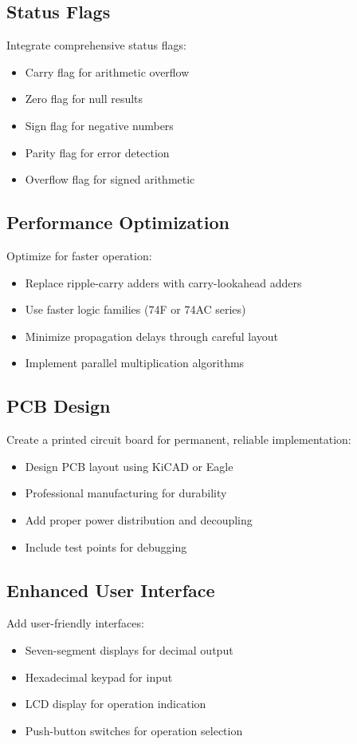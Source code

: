 \subsection{Status Flags}
Integrate comprehensive status flags:
\begin{itemize}
    \item Carry flag for arithmetic overflow
    \item Zero flag for null results
    \item Sign flag for negative numbers
    \item Parity flag for error detection
    \item Overflow flag for signed arithmetic
\end{itemize}

\subsection{Performance Optimization}
Optimize for faster operation:
\begin{itemize}
    \item Replace ripple-carry adders with carry-lookahead adders
    \item Use faster logic families (74F or 74AC series)
    \item Minimize propagation delays through careful layout
    \item Implement parallel multiplication algorithms
\end{itemize}

\subsection{PCB Design}
Create a printed circuit board for permanent, reliable implementation:
\begin{itemize}
    \item Design PCB layout using KiCAD or Eagle
    \item Professional manufacturing for durability
    \item Add proper power distribution and decoupling
    \item Include test points for debugging
\end{itemize}

\subsection{Enhanced User Interface}
Add user-friendly interfaces:
\begin{itemize}
    \item Seven-segment displays for decimal output
    \item Hexadecimal keypad for input
    \item LCD display for operation indication
    \item Push-button switches for operation selection
\end{itemize}

